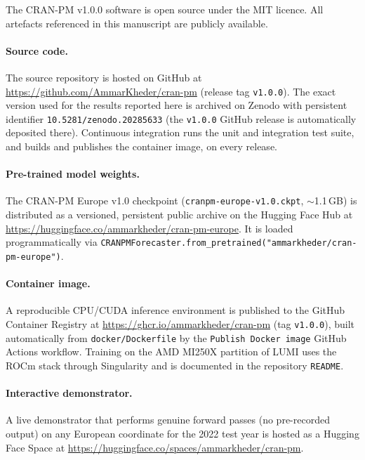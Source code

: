 
The CRAN-PM v1.0.0 software is open source under the MIT licence. All
artefacts referenced in this manuscript are publicly available.

\paragraph{Source code.}
The source repository is hosted on GitHub at
\url{https://github.com/AmmarKheder/cran-pm} (release tag
\texttt{v1.0.0}). The exact version used for the results reported here
is archived on Zenodo with persistent identifier
\texttt{10.5281/zenodo.20285633} (the \texttt{v1.0.0} GitHub release is
automatically deposited there). Continuous integration runs the unit
and integration test suite, and builds and publishes the container
image, on every release.

\paragraph{Pre-trained model weights.}
The CRAN-PM Europe v1.0 checkpoint (\texttt{cranpm-europe-v1.0.ckpt},
$\sim$1.1\,GB) is distributed as a versioned, persistent public archive
on the Hugging Face Hub at
\url{https://huggingface.co/ammarkheder/cran-pm-europe}. It is loaded
programmatically via
\texttt{CRANPMForecaster.from\_pretrained("ammarkheder/cran-pm-europe")}.

\paragraph{Container image.}
A reproducible CPU/CUDA inference environment is published to the
GitHub Container Registry at
\url{https://ghcr.io/ammarkheder/cran-pm} (tag \texttt{v1.0.0}), built
automatically from \texttt{docker/Dockerfile} by the
\texttt{Publish Docker image} GitHub Actions workflow. Training on the
AMD MI250X partition of LUMI uses the ROCm stack through Singularity
and is documented in the repository \texttt{README}.

\paragraph{Interactive demonstrator.}
A live demonstrator that performs genuine forward passes (no
pre-recorded output) on any European coordinate for the 2022 test year
is hosted as a Hugging Face Space at
\url{https://huggingface.co/spaces/ammarkheder/cran-pm}.

